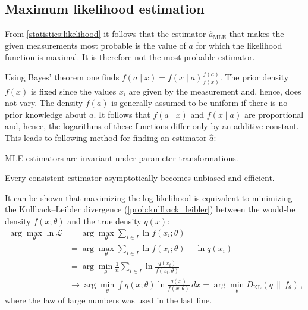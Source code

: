 \subsection{Maximum likelihood estimation}

    From \cref{statistics:likelihood} it follows that the estimator $\hat{a}_{\text{MLE}}$ that makes the given measurements most probable is the value of $a$ for which the likelihood function is maximal. It is therefore not the most probable estimator.

    Using Bayes' theorem one finds $f(a\mid x) = f(x\mid a)\frac{f(a)}{f(x)}$. The prior density $f(x)$ is fixed since the values $x_i$ are given by the measurement and, hence, does not vary. The density $f(a)$ is generally assumed to be uniform if there is no prior knowledge about $a$. It follows that $f(a\mid x)$ and $f(x\mid a)$ are proportional and, hence, the logarithms of these functions differ only by an additive constant. This leads to following method for finding an estimator $\hat{a}$:
    \begin{property}
        MLE estimators are invariant under parameter transformations.
    \end{property}

    \begin{property}
        Every consistent estimator asymptotically becomes unbiased and efficient.
    \end{property}

    \begin{property}\label{statistics:minimizing_KL}
        It can be shown that maximizing the log-likelihood is equivalent to minimizing the Kullback--Leibler divergence (\cref{prob:kullback_leibler}) between the would-be density $f(x;\theta)$ and the true density $q(x)$:
        \begin{align*}
            \arg\max_\theta\ln\mathcal{L} &= \arg\max_\theta\sum_{i\in I}\ln f(x_i;\theta)\\
            &= \arg\max_\theta\sum_{i\in I}\ln f(x_i;\theta) - \ln q(x_i)\\
            &= \arg\min_\theta\frac{1}{n}\sum_{i\in I}\ln\frac{q(x_i)}{f(x_i;\theta)}\\
            &\longrightarrow\arg\min_\theta\int q(x;\theta)\ln\frac{q(x)}{f(x;\theta)}\,dx = \arg\min_\theta D_{\text{KL}}(q\,\|\,f_\theta)\,,
        \end{align*}
        where the law of large numbers was used in the last line.
    \end{property}

